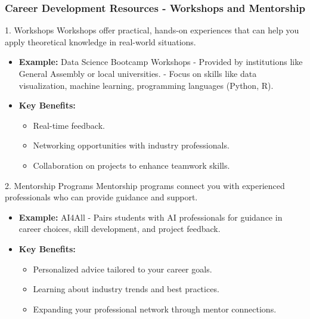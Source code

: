 \documentclass{beamer}
\begin{document}
\begin{frame}[fragile]
    \frametitle{Career Development Resources - Workshops and Mentorship}
    \begin{block}{1. Workshops}
        Workshops offer practical, hands-on experiences that can help you apply theoretical knowledge in real-world situations.
    \end{block}
    \begin{itemize}
        \item \textbf{Example:} Data Science Bootcamp Workshops
        - Provided by institutions like General Assembly or local universities.
        - Focus on skills like data visualization, machine learning, programming languages (Python, R).
        
        \item \textbf{Key Benefits:}
        \begin{itemize}
            \item Real-time feedback.
            \item Networking opportunities with industry professionals.
            \item Collaboration on projects to enhance teamwork skills.
        \end{itemize}
    \end{itemize}
    
    \begin{block}{2. Mentorship Programs}
        Mentorship programs connect you with experienced professionals who can provide guidance and support.
    \end{block}
    \begin{itemize}
        \item \textbf{Example:} AI4All
        - Pairs students with AI professionals for guidance in career choices, skill development, and project feedback.
        
        \item \textbf{Key Benefits:}
        \begin{itemize}
            \item Personalized advice tailored to your career goals.
            \item Learning about industry trends and best practices.
            \item Expanding your professional network through mentor connections.
        \end{itemize}
    \end{itemize}
\end{frame}
\end{document}
